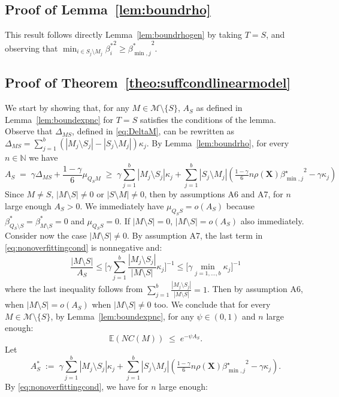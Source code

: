 \documentclass[aos]{imsart}
\theoremstyle{plain}
\newcommand{\E}{\mathbb{E}}
\newcommand{\N}{\mathbb{N}}
\newcommand{\bs}{\boldsymbol}
\begin{document}
\subsection{Proof of Lemma~\ref{lem:boundrho}}
This result follows directly Lemma~\ref{lem:boundrhogen} by taking $T=S$, and observing that $\min_{i\in S_j\setminus M_j}{\beta^*_i}^2\geq {\beta^*_{\min,j}}^2$.

\subsection{Proof of Theorem~\ref{theo:suffcondlinearmodel}} We start by showing that, for any $M\in\mathcal{M}\setminus \{S\}$, $A_S$ as defined in Lemma~\ref{lem:boundexpnc} for $T=S$ satisfies the conditions of the lemma. Observe that $\Delta_{MS}$, defined in \eqref{eq:DeltaM}, can be rewritten as $\Delta_{MS}=\sum_{j=1}^b(|M_j\setminus S_j|-|S_j\setminus M_j|)\kappa_j$. By  Lemma~\ref{lem:boundrho}, for every $n\in \N$ we have 
\begin{equation}\label{eq:nonoverfittingcond}
   A_S\;=\; \gamma \Delta_{MS}+\frac{1-\gamma}{6}\mu_{Q_SM}\;\geq\; \gamma\sum_{j=1}^b|M_j \setminus S_j|\kappa_j + \sum_{j=1}^b |S_j\setminus M_j |\left(\tfrac{1-\gamma}{6} n \rho(\bs X) {\beta^{\star}_{\min,j}}^{2} - \gamma\kappa_j\right) 
\end{equation} 
Since $M\neq S$, $|M\setminus S|\neq0$ or $|S\setminus M|\neq0$, then by assumptions A6 and A7, for $n$ large enough $A_S>0$. We immediately have $\mu_{Q_S S}=o(A_S)$ because $\beta^*_{Q_S\setminus S}=\beta^*_{M\setminus S}=0$ and $\mu_{Q_S S}=0$. If $|M\setminus S|=0$, $|M\setminus S|=o(A_S)$ also immediately. Consider now the case $|M\setminus S|\neq 0$. By assumption A7, the last term in \eqref{eq:nonoverfittingcond} is nonnegative and:
$$\frac{|M\setminus S|}{A_S}\leq \bigg[ \gamma\sum_{j=1}^b\frac{|M_j \setminus S_j|}{|M\setminus S|}\kappa_j \bigg]^{-1} \leq \Big[ \gamma\min_{j=1,\ldots,b}\kappa_j \Big]^{-1} $$
where the last inequality follows from $\sum_{j=1}^b\frac{|M_j \setminus S_j|}{|M\setminus S|}=1$. Then by assumption A6, when $|M\setminus S|=o(A_S)$ when $|M\setminus S|\neq 0$ too.
We conclude that for every $M\in \mathcal M\setminus \{S\}$, by Lemma~\ref{lem:boundexpnc}, for any $\psi\in(0,1)$ and $n$ large enough:
$$
\E(NC(M))\;\leq\;e^{-\psi A_S}.
$$
Let 
$$A_S^*\;:=\;\gamma\sum_{j=1}^b|M_j \setminus S_j|\kappa_j + \sum_{j=1}^b |S_j\setminus M_j |\left(\tfrac{1-\gamma}{6} n \rho(\bs X) {\beta^{\star}_{\min,j}}^{2} - \gamma\kappa_j\right).$$
By \eqref{eq:nonoverfittingcond}, we have for $n$ large enough:
\end{document}
